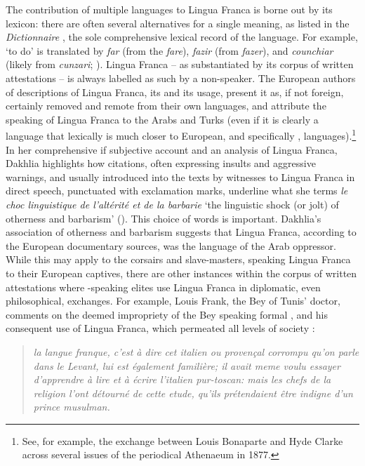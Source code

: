 \documentclass[output=paper]{langsci/langscibook}
\begin{document}
	The contribution of multiple languages to Lingua Franca is borne out by its lexicon: there are often several alternatives for a single meaning, as listed in the \textit{Dictionnaire} \citep{Anonymous1830}, the sole comprehensive lexical record of the language. For example, ‘to do’ is translated by \textit{far} (from the  \textit{fare}), \textit{fazir} (from  \textit{fazer}), and \textit{counchiar} (likely from  \textit{cunzari}; \citealt[316]{Cifoletti2004}). Lingua Franca – as substantiated by its corpus of written attestations – is always labelled as such by a non-speaker. The European authors of descriptions of Lingua Franca, its  and its usage, present it as, if not foreign, certainly removed and remote from their own languages, and attribute the speaking of Lingua Franca to the Arabs and Turks (even if it is clearly a language that lexically is much closer to European, and specifically , languages).\footnote{See, for example, the exchange between Louis Bonaparte and Hyde Clarke across several issues of the periodical Athenaeum in 1877.} In her comprehensive if subjective account and an  analysis of Lingua Franca, Dakhlia highlights how citations, often expressing insults and aggressive warnings, and usually introduced into the texts by witnesses to Lingua Franca in direct speech, punctuated with exclamation marks, underline what she terms \textit{le choc linguistique de l’altérité et de la barbarie} ‘the linguistic shock (or jolt) of otherness and barbarism’ (\citealt[351]{Dakhlia2008}). This choice of words is important. Dakhlia’s association of otherness and barbarism suggests that Lingua Franca, according to the European documentary sources, was the language of the Arab oppressor. While this may apply to the corsairs and slave-masters, speaking Lingua Franca to their European captives, there are other instances within the corpus of written attestations where -speaking elites use Lingua Franca in diplomatic, even philosophical, exchanges. For example, Louis Frank, the Bey of Tunis’ doctor, comments on the deemed impropriety of the Bey speaking formal , and his consequent use of Lingua Franca, which permeated all levels of society \citep[70]{Frank1850}:
	
	\begin{quote}
		\textit{la langue franque, c’est à dire cet italien ou provençal corrompu qu’on parle dans le Levant, lui est également familière; il avait meme voulu essayer d’ap\-prendre à lire et à écrire l’italien pur-toscan: mais les chefs de la religion l’ont détourné de cette etude, qu’ils prétendaient être indigne d’un prince musulman.}
	\end{quote}
	
\end{document}
